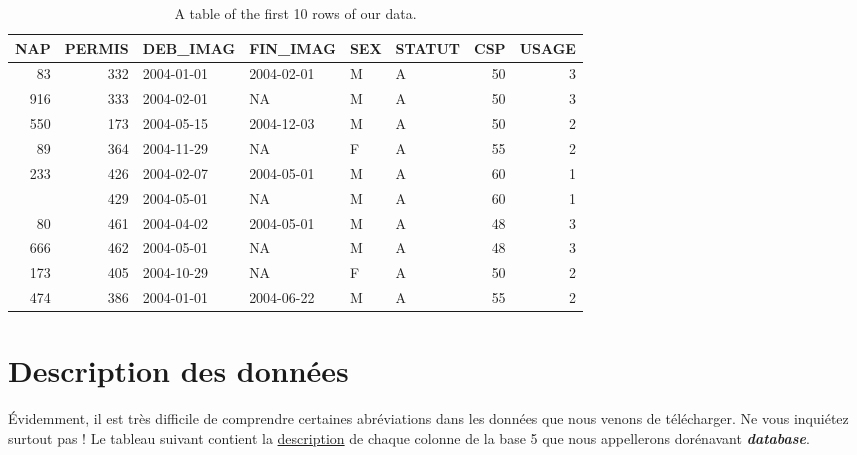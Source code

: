 \documentclass[
]{book}
\theoremstyle{definition}
\theoremstyle{definition}
\theoremstyle{definition}
\theoremstyle{definition}
\theoremstyle{remark}
\begin{document}
\begin{table}

\caption{\label{tab:unnamed-chunk-1}A table of the first 10 rows of our data.}
\centering
\begin{tabular}[t]{rrllllrr}
\toprule
NAP & PERMIS & DEB\_IMAG & FIN\_IMAG & SEX & STATUT & CSP & USAGE\\
\midrule
83 & 332 & 2004-01-01 & 2004-02-01 & M & A & 50 & 3\\
916 & 333 & 2004-02-01 & NA & M & A & 50 & 3\\
550 & 173 & 2004-05-15 & 2004-12-03 & M & A & 50 & 2\\
89 & 364 & 2004-11-29 & NA & F & A & 55 & 2\\
233 & 426 & 2004-02-07 & 2004-05-01 & M & A & 60 & 1\\
\addlinespace
666 & 429 & 2004-05-01 & NA & M & A & 60 & 1\\
80 & 461 & 2004-04-02 & 2004-05-01 & M & A & 48 & 3\\
666 & 462 & 2004-05-01 & NA & M & A & 48 & 3\\
173 & 405 & 2004-10-29 & NA & F & A & 50 & 2\\
474 & 386 & 2004-01-01 & 2004-06-22 & M & A & 55 & 2\\
\bottomrule
\end{tabular}
\end{table}

\hypertarget{description-des-donnuxe9es}{%
\section{Description des données}\label{description-des-donnuxe9es}}

Évidemment, il est très difficile de comprendre certaines abréviations dans les données que nous venons de télécharger. Ne vous inquiétez surtout pas ! Le tableau suivant contient la \href{https://github.com/AODiakite/Tarification/blob/master/data/D\%C3\%A9tails\%20des\%20variables.xls}{description} de chaque colonne de la base 5 que nous appellerons dorénavant \textbf{\emph{database}}.
\end{document}
